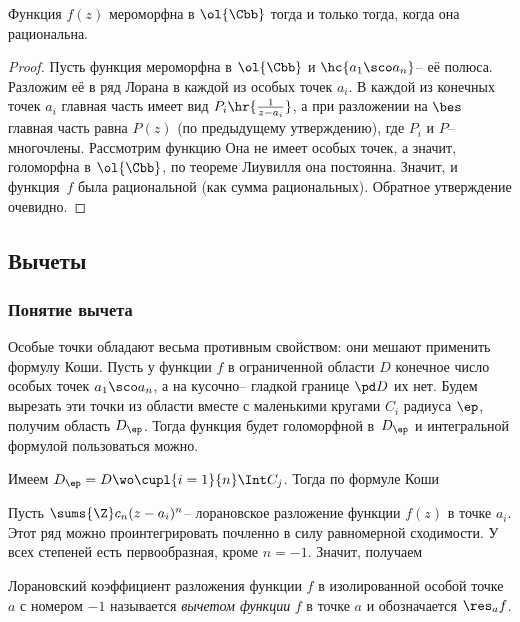 \documentclass[a4paper]{article}
\begin{document}
\begin{stm}
Функция $f(z)$ мероморфна в $\ol{\Cbb}$ тогда и только тогда, когда она рациональна.
\end{stm}
\begin{proof}
Пусть функция мероморфна в $\ol{\Cbb}$ и $\hc{a_1 \sco a_n}$-- её полюса.
Разложим её в ряд Лорана в каждой из особых точек $a_i$. В каждой из конечных точек $a_i$ главная часть имеет
вид $P_i\hr{\frac{1}{z-a_i}}$, а при разложении на $\bes$ главная часть равна $P(z)$ (по предыдущему утверждению),
где $P_i$ и $P$-- многочлены. Рассмотрим функцию
Она не имеет особых точек, а значит, голоморфна в $\ol{\Cbb}$, по теореме Лиувилля она постоянна. Значит, и функция~$f$
была рациональной (как сумма рациональных). Обратное утверждение очевидно.
\end{proof}

\subsection{Вычеты}

\subsubsection{Понятие вычета}

Особые точки обладают весьма противным
свойством: они мешают применить формулу Коши. Пусть
у функции $f$ в ограниченной области $D$ конечное число особых точек $a_1 \sco a_n$, а
на кусочно-- гладкой границе $\pd D$ их нет. Будем вырезать эти точки из области вместе
с маленькими кругами $C_i$ радиуса $\ep$, получим область $D_\ep$. Тогда функция будет голоморфной
в~$D_\ep$ и интегральной формулой пользоваться можно.

Имеем $D_\ep= D \wo \cupl{i=1}{n}\Int C_j$. Тогда по формуле Коши

Пусть $\sums{\Z}c_n(z-a_i)^n$-- лорановское разложение функции $f(z)$ в точке $a_i$.
Этот ряд можно проинтегрировать почленно в силу равномерной сходимости. У всех степеней есть первообразная, кроме
$n=-1$. Значит, получаем

\begin{df}
Лорановский коэффициент разложения функции $f$ в изолированной особой точке $a$ с номером $-1$
называется \emph{вычетом функции} $f$ в точке $a$ и обозначается $\res_a f$.
\end{df}
\end{document}
